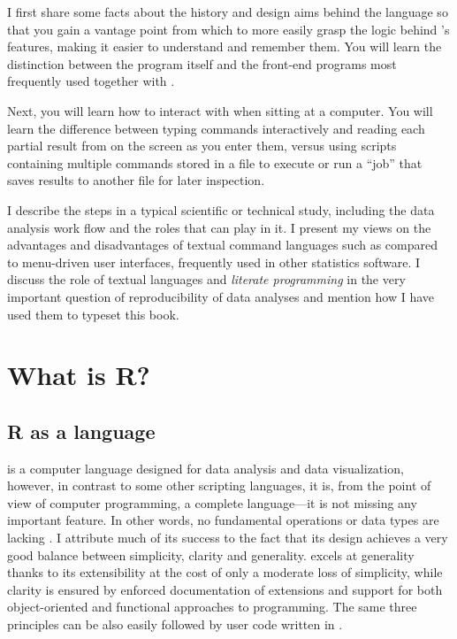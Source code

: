 \documentclass[krantz2]{krantz}\usepackage{knitr}
\begin{document}
I first share some facts about the history and design aims behind the \Rlang language so that you gain a vantage point from which to more easily grasp the logic behind \Rlang's features, making it easier to understand and remember them. You will learn the distinction between the \Rpgrm program itself and the front-end programs most frequently used together with \Rpgrm.

Next, you will learn how to interact with \Rpgrm when sitting at a computer. You will learn the difference between typing commands interactively and reading each partial result from \Rlang on the screen as you enter them, versus using \Rlang scripts containing multiple commands stored in a file to execute or run a ``job'' that saves results to another file for later inspection.

I describe the steps in a typical scientific or technical study, including the data analysis work flow and the roles that \Rpgrm can play in it. I present my views on the advantages and disadvantages of textual command languages such as \Rlang compared to menu-driven user interfaces, frequently used in other statistics software. I discuss the role of textual languages and \emph{literate programming} in the very important question of reproducibility of data analyses and mention how I have used them to typeset this book.

\section{What is R?}

\subsection{R as a language}
\Rlang is a computer language designed for data analysis and data visualization, however, in contrast to some other scripting languages, it is, from the point of view of computer programming, a complete language---it is not missing any important feature. In other words, no fundamental operations or data types are lacking \autocite{Chambers2016}. I attribute much of its success to the fact that its design achieves a very good balance between simplicity, clarity and generality. \Rlang excels at generality thanks to its extensibility at the cost of only a moderate loss of simplicity, while clarity is ensured by enforced documentation of extensions and support for both object-oriented and functional approaches to programming. The same three principles can be also easily followed by user code written in \Rlang.
\end{document}
